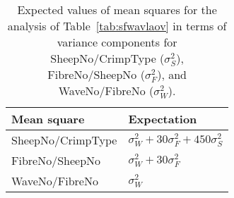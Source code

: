 %

\begin{table}[htp]
\centering
\caption{Expected values of mean squares for the analysis of Table~\ref{tab:sfwavlaov} in terms of variance components for SheepNo/CrimpType ($\sigma^{2}_{S}$), FibreNo/SheepNo  ($\sigma^{2}_{F}$), and WaveNo/FibreNo ($\sigma^{2}_{W}$).}
\label{tab:ems}
\vspace{0.1in}
\begin{tabular}{|p{1.4in}|p{2.4in}|} \hline
     Mean square & Expectation    \\  \hline
 SheepNo/CrimpType & $\sigma^{2}_{W} + 30 \sigma^{2}_{F} + 450 \sigma^{2}_{S}$     \\ 
 FibreNo/SheepNo & $\sigma^{2}_{W} + 30 \sigma^{2}_{F}$   \\
 WaveNo/FibreNo & $\sigma^{2}_{W}$  \\ \hline
\end{tabular}
\end{table}

%
